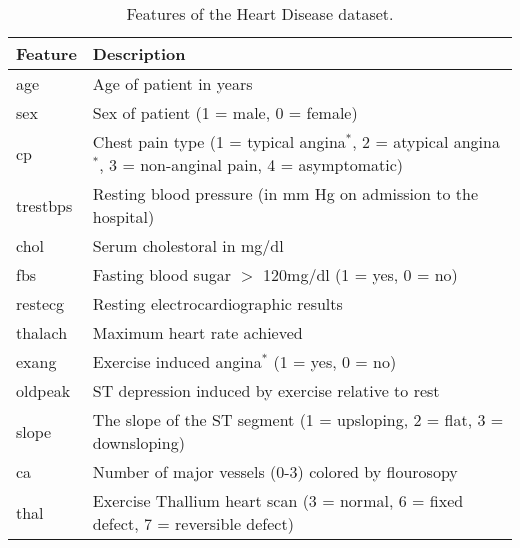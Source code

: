 \documentclass[a4paper,twocolumn]{article}
\begin{document}
\begin{table}[h]
    \centering
    \caption{Features of the Heart Disease dataset.}
    \label{tab:1}
    \begin{tabular}{|p{1.2cm}|p{5.5cm}|}
    \hline
        \cellcolor{gray!25} \textbf{Feature} & \cellcolor{gray!25} \textbf{Description} \\ 
        \hline\hline
        age & Age of patient in years \\ 
        \hline
        sex & Sex of patient (1 = male, 0 = female)\\
        \hline
        cp & Chest pain type (1 = typical angina$^*$, 2 = atypical angina$^*$, 3 = non-anginal pain, 4 = asymptomatic)\\
        \hline
        trestbps & Resting blood pressure (in mm Hg on admission to the hospital)\\
        \hline
        chol & Serum cholestoral in mg/dl\\
        \hline
        fbs & Fasting blood sugar $>$ 120mg/dl (1 = yes, 0 = no)\\
        \hline
        restecg & Resting electrocardiographic results\\
        \hline
        thalach & Maximum heart rate achieved\\
        \hline
        exang & Exercise induced angina$^*$ (1 = yes, 0 = no)\\
        \hline
        oldpeak & ST depression induced by exercise relative to rest\\
        \hline
        slope & The slope of the ST segment (1 = upsloping, 2 = flat, 3 = downsloping)\\
        \hline
        ca & Number of major vessels (0-3) colored by flourosopy\\
        \hline
        thal & Exercise Thallium heart scan (3 = normal, 6 = fixed defect, 7 = reversible defect)\\
        \hline
    \end{tabular}
\end{table}\\
\end{document}
